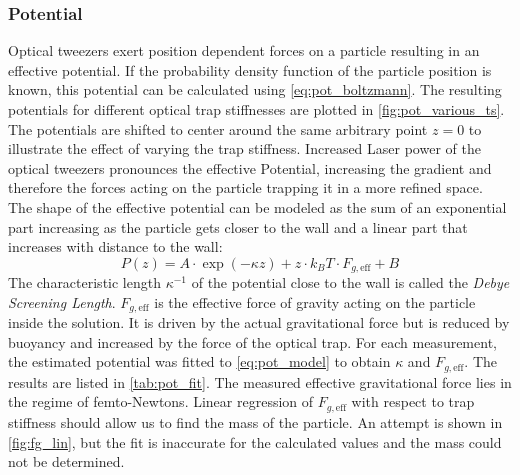 \documentclass[
    twoside=false,
    twocolumn=true,
    fontsize=11pt,
]{scrarticle}
\begin{document}
\subsubsection*{Potential}
Optical tweezers exert position dependent forces on a particle resulting in an effective potential. If the probability density function of the particle position is known, this potential can be calculated using \autoref{eq:pot_boltzmann}. The resulting potentials for different optical trap stiffnesses are plotted in \autoref{fig:pot_various_ts}. The potentials are shifted to center around the same arbitrary point $z=0$ to illustrate the effect of varying the trap stiffness. Increased Laser power of the optical tweezers pronounces the effective Potential, increasing the gradient and therefore the forces acting on the particle trapping it in a more refined space.\\
The shape of the effective potential can be modeled as the sum of an exponential part increasing as the particle gets closer to the wall and a linear part that increases with distance to the wall:
\begin{equation}
 \label{eq:pot_model}
 P(z) = A \cdot \exp(-\kappa z) + z \cdot k_B T \cdot F_{g,\text{eff}} + B
\end{equation}
The characteristic length $\kappa^{-1}$ of the potential close to the wall is called the \textit{Debye Screening Length}. $F_{g,\text{eff}}$ is the effective force of gravity acting on the particle inside the solution. It is driven by the actual gravitational force but is reduced by buoyancy and increased by the force of the optical trap. For each measurement, the estimated potential was fitted to \autoref{eq:pot_model} to obtain $\kappa$ and $F_{g,\text{eff}}$. The results are listed in \autoref{tab:pot_fit}. The measured effective gravitational force lies in the regime of femto-Newtons. Linear regression of $F_{g,\text{eff}}$ with respect to trap stiffness should allow us to find the mass of the particle. An attempt is shown in \autoref{fig:fg_lin}, but the fit is inaccurate for the calculated values and the mass could not be determined.
\end{document}
